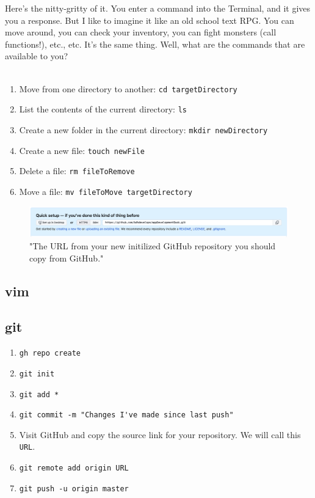 \documentclass[11pt, letterpaper]{article}
\begin{document}
Here's the nitty-gritty of it. You enter a command into the Terminal, and it gives you a response. But I like to imagine it
like an old school text RPG. You can move around, you can check your inventory, you can fight monsters (call functions!),
etc., etc. It's the same thing. Well, what are the commands that are available to you? \\\

\begin{enumerate}
    \itemsep0em
    \item{Move from one directory to another: \verb+cd targetDirectory+}
    \item{List the contents of the current directory: \verb+ls+}
    \item{Create a new folder in the current directory: \verb+mkdir newDirectory+}
    \item{Create a new file: \verb+touch newFile+}
    \item{Delete a file: \verb+rm fileToRemove+}
    \item{Move a file: \verb+mv fileToMove targetDirectory+}
\end{enumerate}

\begin{figure}[ht]
    \centering
        \includegraphics[scale=.3]{git_repository_URL_screenshot}
    \caption{"The URL from your new initilized GitHub repository you should copy from GitHub."}
\end{figure}

\subsection*{vim}

\subsection*{git}

\begin{enumerate}
    \itemsep0em
    \item{\verb+gh repo create+}
    \item{\verb+git init+}
    \item{\verb+git add *+}
    \item{\verb+git commit -m "Changes I've made since last push"+}
    \item{Visit GitHub and copy the source link for your repository. We will call this \verb+URL+.}
    \item{\verb+git remote add origin URL+}
    \item{\verb+git push -u origin master+}
\end{enumerate}
\end{document}
